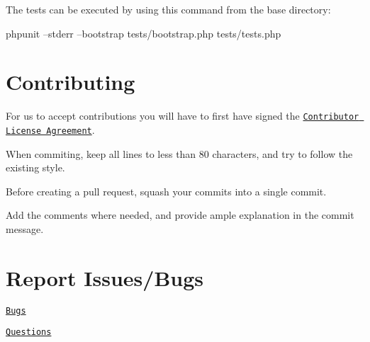The tests can be executed by using this command from the base directory\-: \begin{DoxyVerb}phpunit --stderr --bootstrap tests/bootstrap.php tests/tests.php
\end{DoxyVerb}


\section*{Contributing }

For us to accept contributions you will have to first have signed the \href{https://developers.facebook.com/opensource/cla}{\tt Contributor License Agreement}.

When commiting, keep all lines to less than 80 characters, and try to follow the existing style.

Before creating a pull request, squash your commits into a single commit.

Add the comments where needed, and provide ample explanation in the commit message.

\section*{Report Issues/\-Bugs }

\href{https://developers.facebook.com/bugs}{\tt Bugs}

\href{http://facebook.stackoverflow.com}{\tt Questions} 